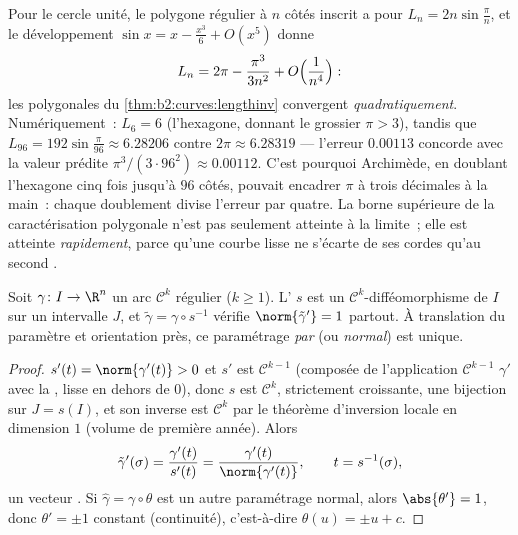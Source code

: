 \begin{example}\label{ex:b2:curves:archimedes}
Pour le cercle unité, le polygone régulier à $n$ côtés inscrit a
pour  $L_n = 2n\sin\frac\pi n$, et le développement
$\sin x = x - \frac{x^3}6 + O(x^5)$ donne
\[
L_n = 2\pi - \frac{\pi^3}{3n^2} + O\Bigl(\frac1{n^4}\Bigr) :
\]
les  polygonales du \cref{thm:b2:curves:lengthinv}
convergent \emph{quadratiquement}. Numériquement~: $L_6 = 6$
(l'hexagone, donnant le grossier $\pi > 3$), tandis que $L_{96} =
192\sin\frac{\pi}{96} \approx 6.28206$ contre $2\pi \approx
6.28319$ --- l'erreur $0.00113$ concorde avec la valeur prédite
$\pi^3/(3\cdot96^2) \approx 0.00112$. C'est pourquoi Archimède,
en doublant l'hexagone cinq fois jusqu'à $96$ côtés, pouvait
encadrer $\pi$ à trois décimales à la main~: chaque doublement
divise l'erreur par quatre. La borne supérieure de la
caractérisation polygonale n'est pas seulement atteinte à la
limite~; elle est atteinte \emph{rapidement}, parce qu'une
courbe lisse ne s'écarte de ses cordes qu'au second .
\end{example}

\begin{theorem}\label{thm:b2:curves:arclength}
Soit $\gamma \colon I \to \R^n$ un arc $\mathcal{C}^k$ régulier
($k \geq 1$). L' $s$ est un $\mathcal{C}^k$-difféomorphisme
de $I$ sur un intervalle $J$, et $\tilde\gamma =
\gamma \circ s^{-1}$ vérifie $\norm{\tilde\gamma'} = 1$
partout. À translation du paramètre et orientation près,
ce paramétrage \emph{par } (ou \emph{normal}) est
unique.
\end{theorem}

\begin{proof}
$s'(t) = \norm{\gamma'(t)} > 0$ et $s'$ est $\mathcal{C}^{k-1}$
(composée de l'application $\mathcal{C}^{k-1}$ $\gamma'$ avec la
, lisse en dehors de $0$), donc $s$ est $\mathcal{C}^k$,
strictement croissante, une bijection sur $J = s(I)$, et son
inverse est $\mathcal{C}^k$ par le théorème d'inversion locale en
dimension $1$ (volume de première année). Alors
\[
\tilde\gamma'(\sigma)
= \frac{\gamma'(t)}{s'(t)}
= \frac{\gamma'(t)}{\norm{\gamma'(t)}},
\qquad t = s^{-1}(\sigma),
\]
un vecteur . Si $\hat\gamma = \gamma\circ\theta$ est un
autre paramétrage normal, alors $\abs{\theta'} = 1$, donc $\theta'
= \pm 1$ constant (continuité), c'est-à-dire $\theta(u) = \pm u + c$.
\end{proof}

